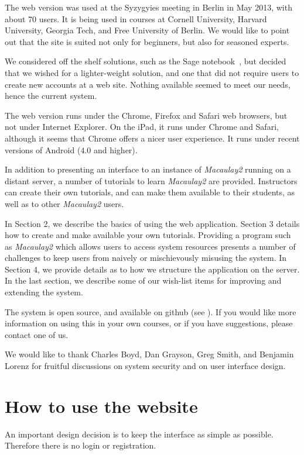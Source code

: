 \documentclass[twocolumn]{article}
\def\M2{{\it Macaulay2}}
\begin{document}
 The web version was used at the Syzygyies
meeting in Berlin in May 2013, with about 70 users. It is being used in courses at Cornell
University, Harvard University, Georgia Tech, and Free University of
 Berlin. We would like to point out that the
site is suited not only for beginners, but also for seasoned experts.

We considered off the shelf solutions, such as the Sage
notebook~\cite{sagenotebook}, but decided that we wished for a
lighter-weight solution, and one that did not require users to create
new accounts at a web site.  Nothing available seemed to meet our
needs, hence the current system.

The web version runs under the Chrome, Firefox and Safari web browsers, but not
under Internet Explorer.  On the iPad, it runs under Chrome and
Safari, although it seems that Chrome offers a nicer user experience.
It runs under recent versions of Android ($4.0$ and higher).

In addition to presenting an interface to an instance of \M2
running on a distant server, a number of tutorials to
learn \M2 are provided.  Instructors can create their own
tutorials, and can make them available to their students, as well as
to other \M2 users.  

In Section 2, we describe the basics of using the web application.
Section 3 details how to create and make available your own tutorials.
Providing a program such as \M2 which allows users to
access system resources presents a number of challenges to keep users
from naively or mischievously misusing the system.  In Section 4, we
provide details as to how we structure the application on the server.
In the last section, we describe some of our wish-list items for
improving and extending the system.

The system is open source, and available on github (see \cite{github}).
If you would like more information on using this in your own courses,
or if you have suggestions, please contact one of us.

We would like to thank Charles Boyd, Dan Grayson, Greg Smith, and Benjamin Lorenz for
fruitful discussions on system security and on user interface design.

\section{How to use the website}

An important
design decision is to keep the interface as simple as possible.
Therefore there is no login or registration.
\end{document}
